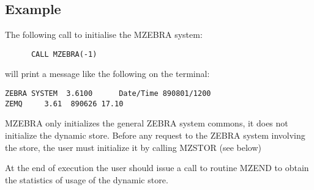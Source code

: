 \subsection{Example}
\par The following call to initialise the MZEBRA system:
\begin{verbatim}
      CALL MZEBRA(-1)
\end{verbatim}
will print a message like the following on the terminal:
\begin{verbatim}
ZEBRA SYSTEM  3.6100      Date/Time 890801/1200
ZEMQ     3.61  890626 17.10
\end{verbatim}
MZEBRA only initializes the general ZEBRA system commons,
it does not initialize the dynamic store.
Before any request to the ZEBRA system involving the store,
the user must initialize it by calling MZSTOR (see below)
\par At the end of execution the user should issue a call to routine
MZEND to obtain
the statistics of usage of the dynamic store.
